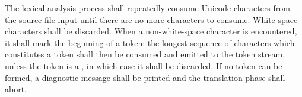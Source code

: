 
\specsubitem
The lexical analysis process shall repeatedly consume Unicode characters from
the source file input until there are no more characters to consume. White-space
characters shall be discarded. When a non-white-space character is encountered,
it shall mark the beginning of a token: the longest sequence of characters which
constitutes a token shall then be consumed and emitted to the token stream,
unless the token is a , in which case it shall be
discarded. If no token can be formed, a diagnostic message shall be printed and
the translation phase shall abort.
